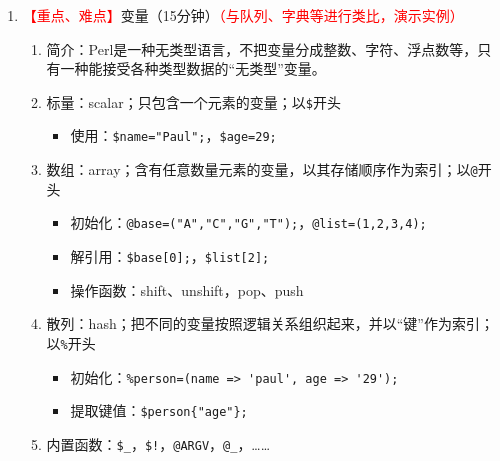 \documentclass{TIJMUjiaoanLL}
\begin{document}
\begin{enumerate}
\begin{enumerate}
\begin{itemize}
	  \item 书籍（编程语言角度）：\textit{Learning Perl} $\Rightarrow$ \textit{Intermediate Perl} $\Rightarrow$ \textit{Mastering Perl} $\Rightarrow$ \textit{Programming Perl} $\Rightarrow$ \textit{Advanced Perl Programming}
	\end{itemize}
      \item \textcolor{red}{【重点】}基本语法\textcolor{red}{（演示实例操作）}
\vspace*{-10pt}
	\begin{multicols}{2}
\begin{verbatim}
#!/usr/bin/perl
use strict;
use warnings;
print "Hello World!\n";
\end{verbatim}
\begin{enumerate}
  \item 编写脚本，vim hello.pl
  \item 修改权限，chmod 755 hello.pl
  \item 运行脚本，perl hello.pl，./hello.pl
\end{enumerate}
\end{multicols}
\vspace*{-10pt}
      \item 其他：文本编辑器（Vim，插件：perl-support.vim）；检查语法（perl -c script.pl）；格式化代码（perltidy）
    \end{enumerate}
  \item \textcolor{red}{【重点、难点】}变量（15分钟）\textcolor{red}{（与队列、字典等进行类比，演示实例）}
    \begin{enumerate}
      \item 简介：Perl是一种无类型语言，不把变量分成整数、字符、浮点数等，只有一种能接受各种类型数据的“无类型”变量。
      \item 标量：scalar；只包含一个元素的变量；以\verb|$|开头
	\begin{itemize}
	  \item 使用：\verb|$name="Paul";|，\verb|$age=29;|
	\end{itemize}
      \item 数组：array；含有任意数量元素的变量，以其存储顺序作为索引；以\verb|@|开头
	\begin{itemize}
	  \item 初始化：\verb|@base=("A","C","G","T");|，\verb|@list=(1,2,3,4);|
	  \item 解引用：\verb|$base[0];|，\verb|$list[2];|
	  \item 操作函数：shift、unshift，pop、push
	\end{itemize}
      \item 散列：hash；把不同的变量按照逻辑关系组织起来，并以“键”作为索引；以\verb|%|开头
	\begin{itemize}
	  \item 初始化：\verb|%person=(name => 'paul', age => '29');|
	  \item 提取键值：\verb|$person{"age"};|
	\end{itemize}
      \item 内置函数：\verb|$_|，\verb|$!|，\verb|@ARGV|，\verb|@_|，……
    \end{enumerate}


\end{enumerate}
\end{document}
